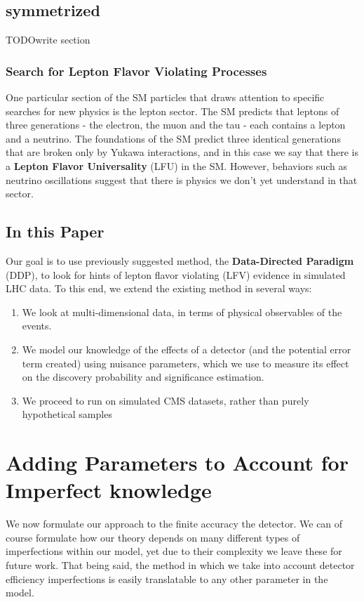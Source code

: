 \documentclass{article}
\begin{document}
\subsection{symmetrized}
TODO{write section}

\subsubsection{Search for Lepton Flavor Violating Processes}

One particular section of the SM particles that draws attention to specific searches for new physics is the lepton sector. The SM predicts that leptons of three generations - the electron, the muon and the tau -  each contains a lepton and a neutrino. The foundations of the SM predict three identical generations that are broken only by Yukawa interactions, and in this case we say that there is a \textbf{Lepton Flavor Universality} (LFU) in the SM. However, behaviors such as neutrino oscillations suggest that there is physics we don't yet understand in that sector.

\subsection{In this Paper}

Our goal is to use previously suggested method, the \textbf{Data-Directed Paradigm} (DDP), to look for hints of lepton flavor violating (LFV) evidence in simulated LHC data. To this end, we extend the existing method in several ways:
\begin{enumerate}
    \item We look at multi-dimensional data, in terms of physical observables of the events.
    \item We model our knowledge of the effects of a detector (and the potential error term created) using nuisance parameters, which we use to measure its effect on the discovery probability and significance estimation.
    \item We proceed to run on simulated CMS datasets, rather than purely hypothetical samples
\end{enumerate}



\section{Adding Parameters to Account for Imperfect knowledge}

We now formulate our approach to the finite accuracy the detector. We can of course formulate how our theory depends on many different types of imperfections within our model, yet due to their complexity we leave these for future work. That being said, the method in which we take into account detector efficiency imperfections is easily translatable to any other parameter in the model.
\end{document}
